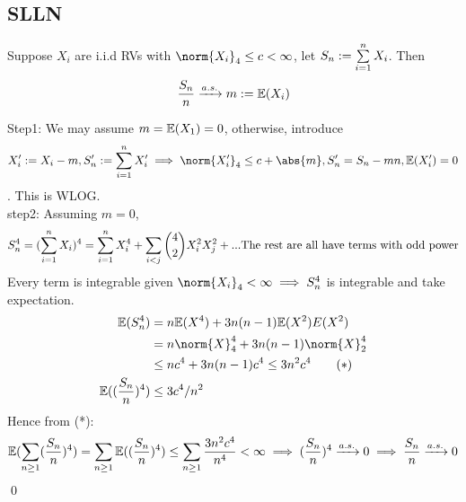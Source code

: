 \subsection*{SLLN}
\begin{dfn}Suppose $X_i$ are i.i.d RVs with $\norm{X_i}_4 \leq c < \infty$, let $S_n := \sum\limits_{i=1}^n X_i$. Then
\begin{equation*}
    \frac{S_n}{n} \xrightarrow{a.s.} m := \mathbb{E}(X_i)
\end{equation*}
\end{dfn}
\pf Step1: We may assume $m = \mathbb{E}(X_1) = 0$, otherwise, introduce \begin{equation*}
    X_i' := X_i - m, S_n' := \bigs{i=1}^n X_i' \implies \norm{X_i'}_4 \leq c + \abs{m}, S_n' = S_n - mn, \E(X_i') = 0
\end{equation*}. This is WLOG. \\
step2: Assuming $m=0$, \begin{equation*}
    S_n^4 = (\sum\limits_{i=1}^n X_i)^4 = \sum\limits_{i=1}^n X_i^4 + \sum\limits_{i<j}\binom{4}{2} X_i^2X_j^2 + ... \text{The rest are all have terms with odd power}
\end{equation*}Every term is integrable given $\norm{X_i}_4  < \infty \implies S_n^4$ is integrable and take expectation.
\begin{align*}
    \E(S_n^4) &=  n \E(X^4) + 3n(n-1)\E(X^2)E(X^2) \\
    &= n\norm{X}_4^4+ 3n(n-1)\norm{X}_2^4 \\
    &\leq n c^4 + 3n(n-1)c^4 \leq 3n^2 c^4 \qquad(*) \\
    \E((\frac{S_n}{n})^4) &\leq 3c^4/n^2
\end{align*}Hence from (*): \begin{equation*}
    \mathbb{E}(\sum\limits_{n\geq 1}(\frac{S_n}{n})^4) = \sum\limits_{n\geq 1} \mathbb{E}((\frac{S_n}{n})^4) \leq \sum\limits_{n\geq 1} \frac{3n^2c^4}{n^4} < \infty \implies (\frac{S_n}{n})^4 \xrightarrow{a.s.} 0 \implies \frac{S_n}{n} \xrightarrow{a.s.} 0
\end{equation*}\qed









